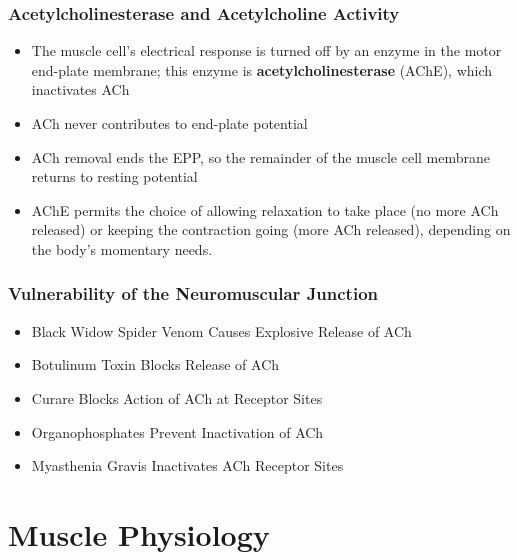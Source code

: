 \documentclass[11pt]{article}
\begin{document}
\subsubsection{Acetylcholinesterase and Acetylcholine Activity}
\begin{itemize}
\item The muscle cell’s electrical response is turned off by an enzyme in the motor end-plate membrane; this enzyme is \textbf{acetylcholinesterase} (AChE), which inactivates ACh
\item ACh never contributes to end-plate potential
\item ACh removal ends the EPP, so the remainder of the muscle cell membrane returns to resting potential
\item AChE permits the choice of allowing relaxation to take place (no more ACh released) or keeping the contraction going (more ACh released), depending on the body’s momentary needs.
\end{itemize}
\subsubsection{Vulnerability of the Neuromuscular Junction}
\begin{itemize}
\item Black Widow Spider Venom Causes Explosive Release of ACh
\item Botulinum Toxin Blocks Release of ACh
\item Curare Blocks Action of ACh at Receptor Sites
\item Organophosphates Prevent Inactivation of ACh
\item Myasthenia Gravis Inactivates ACh Receptor Sites
\end{itemize}







\section{Muscle Physiology}
\end{document}
